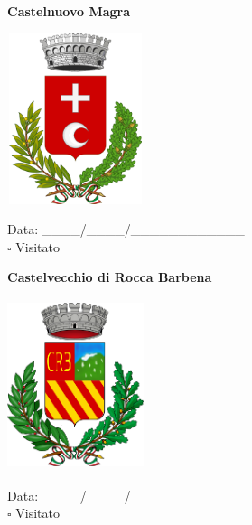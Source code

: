 \documentclass[a5paper,12pt]{article}
\begin{document}
\newpage

\noindent
\begin{minipage}[t]{0.45\textwidth}
    \begin{center}
        \textbf{Castelnuovo Magra}
    \end{center}
    \vspace{-0.5cm} %
    \begin{center}
        \includegraphics[height= 5cm, width=4cm]{Liguria/Stemma Castelnuovo Magra.png}
    \end{center}
    \vspace{-0.4cm} %
    \begin{flushleft}
        Data: \_\_\_\_/\_\_\_\_/\_\_\_\_\_\_\_\_\_\_\_\_ \\
        $\square$ Visitato
    \end{flushleft}
\end{minipage}
\hfill
\noindent
\begin{minipage}[t]{0.45\textwidth}
    \begin{center}
        \textbf{Castelvecchio di Rocca Barbena}
    \end{center}
    \vspace{-0.5cm} %
    \begin{center}
        \includegraphics[height= 5cm, width=4cm]{Liguria/Stemma Castelvecchio di Rocca Barbena.png}
    \end{center}
    \vspace{-0.4cm} %
    \begin{flushleft}
        Data: \_\_\_\_/\_\_\_\_/\_\_\_\_\_\_\_\_\_\_\_\_ \\
        $\square$ Visitato
    \end{flushleft}
\end{minipage}
\end{document}
